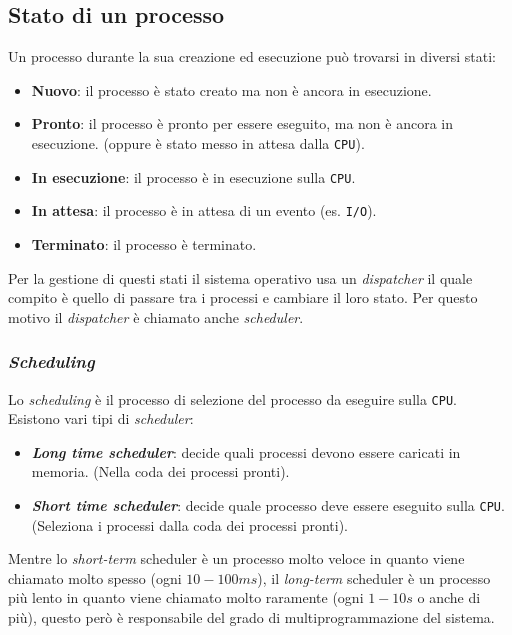     \subsection{Stato di un processo}
        Un processo durante la sua creazione ed esecuzione può trovarsi in diversi stati:
        \begin{itemize}
            \item \textbf{Nuovo}: il processo è stato creato ma non è ancora in esecuzione.
            \item \textbf{Pronto}: il processo è pronto per essere eseguito, ma non è ancora in esecuzione. (oppure è stato messo in attesa dalla \texttt{CPU}).
            \item \textbf{In esecuzione}: il processo è in esecuzione sulla \texttt{CPU}.
            \item \textbf{In attesa}: il processo è in attesa di un evento (es. \texttt{I/O}).
            \item \textbf{Terminato}: il processo è terminato.
        \end{itemize}
        Per la gestione di questi stati il sistema operativo usa un \textit{dispatcher} il quale compito è quello di passare tra i processi e cambiare il loro stato. Per questo motivo il \textit{dispatcher} è chiamato anche \textit{scheduler}.
        \subsubsection{\textit{Scheduling}}
        \label{sec:scheduling04}
            Lo \textit{scheduling} è il processo di selezione del processo da eseguire sulla \texttt{CPU}. Esistono vari tipi di \textit{scheduler}:
            \begin{itemize}
                \item \textbf{\textit{Long time scheduler}}: decide quali processi devono essere caricati in memoria. (Nella coda dei processi pronti).
                \item \textbf{\textit{Short time scheduler}}: decide quale processo deve essere eseguito sulla \texttt{CPU}. (Seleziona i processi dalla coda dei processi pronti).
            \end{itemize}
            Mentre lo \textit{short-term} scheduler è un processo molto veloce in quanto viene chiamato molto spesso (ogni $10-100 ms$), il \textit{long-term} scheduler è un processo più lento in quanto viene chiamato molto raramente (ogni $1-10 s$ o anche di più), questo però è responsabile del grado di multiprogrammazione del sistema. 
